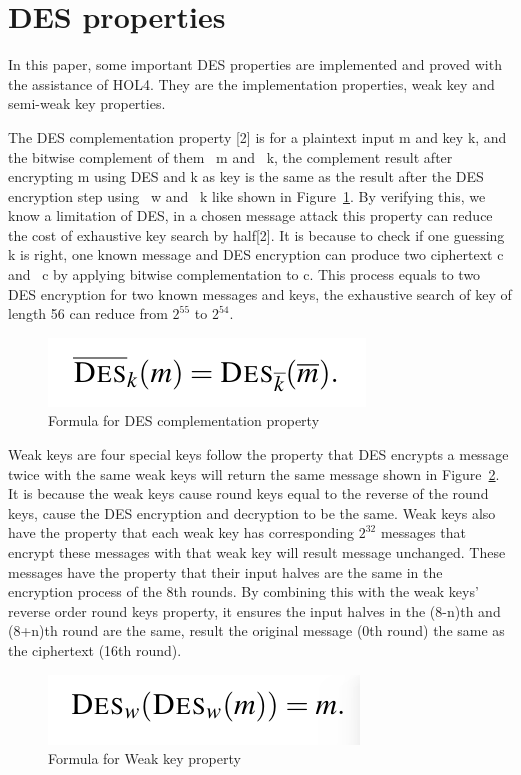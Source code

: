 \documentclass{article}
\begin{document}
\section{DES properties}
In this paper, some important DES properties are implemented and proved with the assistance of HOL4. They are the implementation properties,
weak key and semi-weak key properties.

The DES complementation property [2] is for a plaintext input m and key k, and the bitwise complement of them ~m and ~k, the
complement result after encrypting m using DES and k as key is the same as the result after the DES encryption step
using ~w and ~k like shown in Figure~\ref{fig:form1}. By verifying this, we know a limitation of DES, in a chosen message attack
this property can reduce the cost of exhaustive key search by half[2]. It is because to check if one guessing k is right,
one known message and DES encryption can produce two ciphertext c and ~c by applying bitwise complementation to c. This process
equals to two DES encryption for two known messages and keys, the exhaustive search of key of length 56 can reduce from
$2^{55}$ to $2^{54}$.

\begin{figure}
\centering
\includegraphics[width=0.25\linewidth]{formula1}
\caption{\label{fig:form1} Formula for DES complementation property}
\end{figure}

Weak keys are four special keys follow the property that DES encrypts a message twice with the same weak keys will return
the same message shown in Figure~\ref{fig:form2}. It is because the weak keys cause round keys equal to  the reverse of
the round keys, cause the DES encryption and decryption to be the same. Weak keys also have the property that each weak key
has corresponding $2^{32}$ messages that encrypt these messages with that weak key will result message unchanged. These messages
have the property that their input halves are the same in the encryption process of the 8th rounds. By combining this with the weak keys' reverse
order round keys property, it ensures the input halves in the (8-n)th and (8+n)th round are the same, result the original message (0th round) the same
as the ciphertext (16th round).

\begin{figure}
\centering
\includegraphics[width=0.25\linewidth]{formula2}
\caption{\label{fig:form2} Formula for Weak key property}
\end{figure}
\end{document}
